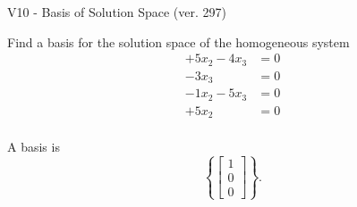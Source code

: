 \begin{exercise}
  \begin{exerciseTitle}V10 - Basis of Solution Space (ver. 297)\end{exerciseTitle}
  \begin{exerciseStatement}
    Find a basis for the solution space of the homogeneous system 
\begin{align*}
 + 5 x_ 2 -4 x_ 3 &= 0  \\ 
  -3 x_ 3 &= 0  \\ 
  -1 x_ 2 -5 x_ 3 &= 0  \\ 
  + 5 x_ 2 &= 0  \\ 
 \end{align*}


 
  \end{exerciseStatement}

  \begin{exerciseAnswer}
   A basis is   
\[\left\{\left[\begin{array}{c}
1 \\
0 \\
0
\end{array}\right]\right\}.\]

  


  \end{exerciseAnswer}
\end{exercise}